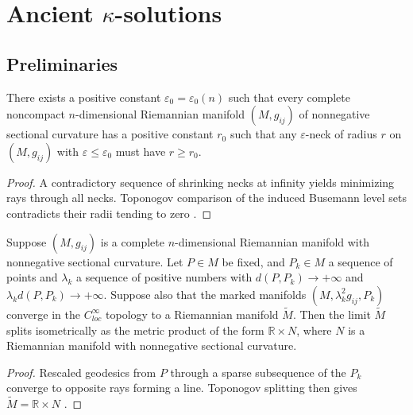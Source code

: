 \chapter{Ancient \texorpdfstring{$\kappa$}{kappa}-solutions}
\label{chap:cz-ancient-kappa-solutions}
\section{Preliminaries}
\begin{proposition}
  \label{prop:cz-neck-radius-lower-bound-at-infinity}

There exists a positive constant $\varepsilon_0=\varepsilon_0(n)$
such that every complete noncompact $n$-dimensional Riemannian
manifold $(M, g_{ij})$ of nonnegative sectional curvature has a
positive constant $r_0$ such that any $\varepsilon$-neck of radius
$r$ on $(M, g_{ij})$ with $\varepsilon \leq \varepsilon_0$ must
have $r\geq r_0$.
\end{proposition}
\begin{proof}
\sketch A contradictory sequence of shrinking necks at infinity yields
minimizing rays through all necks.  Toponogov comparison of the induced
Busemann level sets contradicts their radii tending to zero \cite{CZ05F}.
\end{proof}
\begin{proposition}
  \label{prop:cz-pointed-limit-at-infinity-splits-line}

Suppose $(M,g_{ij})$ is a complete $n$-dimensional Riemannian
manifold with nonnegative sectional curvature. Let $P\in M$ be
fixed, and $P_k\in M$ a sequence of points and $\lambda_k$ a
sequence of positive numbers with $d(P,P_k)\rightarrow +\infty$
and $\lambda_kd(P,P_k)\rightarrow +\infty$. Suppose also that the
marked manifolds $(M,\lambda_k^2g_{ij},P_k)$ converge in the
$C^{\infty}_{loc}$ topology to a Riemannian manifold
$\widetilde{M}$. Then the limit $\widetilde{M}$ splits
isometrically as the metric product of the form $\mathbb{R}\times
N$, where $N$ is a Riemannian manifold with nonnegative sectional
curvature.
\end{proposition}
\begin{proof}
\sketch Rescaled geodesics from $P$ through a sparse subsequence of the
$P_k$ converge to opposite rays forming a line.  Toponogov splitting
then gives $\widetilde M=\mathbb R\times N$ \cite{CZ05F, Mi, BGP}.
\end{proof}
